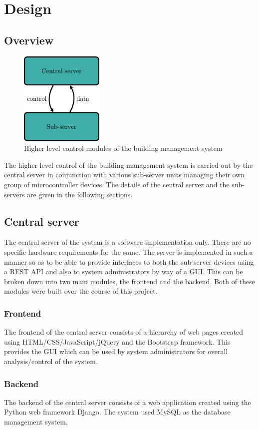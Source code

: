 \documentclass[letterpaper,11pt]{report}
\begin{document}
\newpage
\chapter{Design}\label{chapter:Design}
\onehalfspacing
\section{Overview}
\begin{figure}[h]
\includegraphics[width=4cm, height=4.5cm]{des}
\centering
\captionsetup{justification=centering}
\caption{Higher level control modules of the building management system}
\label{fig:des}
\end{figure}
The higher level control of the building management system is carried out by the central server in conjunction with various sub-server units managing their own group of microcontroller devices. The details of the central server and the sub-servers are given in the following sections.
\section{Central server}
The central server of the system is a software implementation only. There are no specific hardware requirements for the same. The server is implemented in such a manner so as to be able to provide interfaces to both the sub-server devices using a REST API and also to system administrators by way of a GUI. This can be broken down into two main modules, the frontend and the backend. Both of these modules were built over the course of this project.
\subsection{Frontend}
The frontend of the central server consists of a hierarchy of web pages created using HTML/\newline CSS/JavaScript/jQuery and the Bootstrap framework. This provides the GUI which can be used by system administrators for overall analysis/control of the system.
\subsection{Backend}
The backend of the central server consists of a web application created using the Python web framework Django. The system used MySQL as the database management system.
\end{document}
